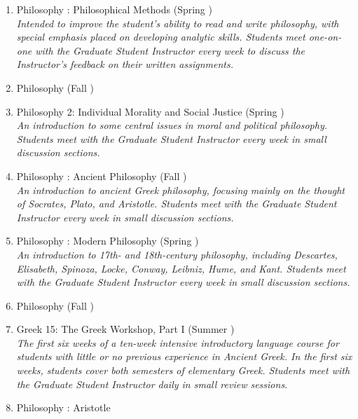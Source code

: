 \documentclass{rhelder3cv}
\begin{document}
\begin{enumerate}
  \item Philosophy : Philosophical Methods
    (Spring )\\
    \emph{%
      \small
      Intended to improve the student’s ability to read and write philosophy,
      with special emphasis placed on developing analytic skills.
      Students meet one-on-one with the Graduate Student Instructor every week
      to discuss the Instructor's feedback on their written assignments.%
    }
  \item Philosophy 
    (Fall )
  \item Philosophy 2: Individual Morality and Social Justice
    (Spring )\\
    \emph{%
      \small
      An introduction to some central issues in moral and political philosophy.
      Students meet with the Graduate Student Instructor every week
      in small discussion sections.%
    }
  \item Philosophy : Ancient Philosophy
    (Fall )\\
    \emph{%
      \small
      An introduction to ancient Greek philosophy,
      focusing mainly on the thought of Socrates, Plato, and Aristotle.
      Students meet with the Graduate Student Instructor every week
      in small discussion sections.%
    }
  \item Philosophy : Modern Philosophy
    (Spring )\\
    \emph{%
      \small
      An introduction to 17th- and 18th-century philosophy,
      including Descartes, Elisabeth, Spinoza, Locke, Conway, Leibniz, Hume,
      and Kant.
      Students meet with the Graduate Student Instructor every week
      in small discussion sections.%
    }
  \item Philosophy 
    (Fall )
  \item Greek 15: The Greek Workshop, Part I
    (Summer )\\
    \emph{%
      \small
      The first six weeks of a ten-week intensive introductory language course
      for students with little or no previous experience in Ancient Greek.
      In the first six weeks,
      students cover both semesters of elementary Greek.
      Students meet with the Graduate Student Instructor daily
      in small review sessions.%
    }
  \item Philosophy : Aristotle

\end{enumerate}
\end{document}
